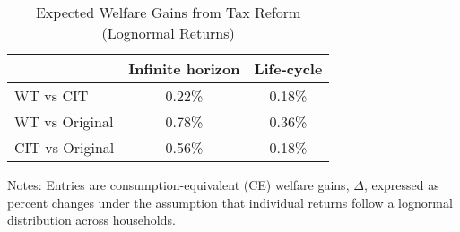 \begin{table}[!htbp]
\centering
\caption{Expected Welfare Gains from Tax Reform (Lognormal Returns)}
\label{tab:ce_welfare_tax_lognorm}
\begin{threeparttable}
\begin{tabular}{lcc}
\toprule
& \textbf{Infinite horizon} & \textbf{Life-cycle} \\
\midrule
WT vs CIT       & 0.22\% & 0.18\% \\
WT vs Original  & 0.78\% & 0.36\% \\
CIT vs Original & 0.56\% & 0.18\% \\
\bottomrule
\end{tabular}
\begin{tablenotes}[flushleft]
\footnotesize
\item Notes: Entries are consumption-equivalent (CE) welfare gains, $\Delta$, expressed as percent changes under the assumption that individual returns follow a lognormal distribution across households. 
\end{tablenotes}
\end{threeparttable}
\end{table}
